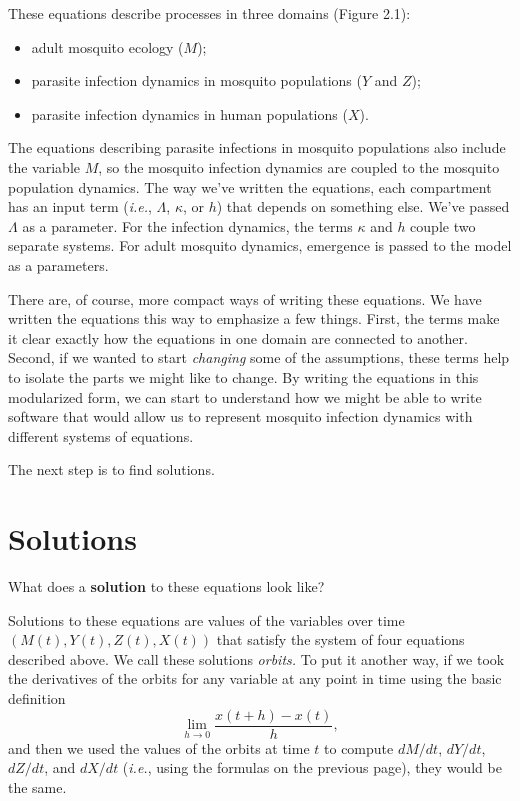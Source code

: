 \documentclass[
]{book}
\begin{document}
These equations describe processes in three domains (Figure 2.1):

\begin{itemize}
\item
  adult mosquito ecology (\(M\));
\item
  parasite infection dynamics in mosquito populations (\(Y\) and \(Z\));
\item
  parasite infection dynamics in human populations (\(X\)).
\end{itemize}

The equations describing parasite infections in mosquito populations also include the variable \(M\), so the mosquito infection dynamics are coupled to the mosquito population dynamics. The way we've written the equations, each compartment has an input term (\emph{i.e.}, \(\Lambda\), \(\kappa\), or \(h\)) that depends on something else. We've passed \(\Lambda\) as a parameter. For the infection dynamics, the terms \(\kappa\) and \(h\) couple two separate systems. For adult mosquito dynamics, emergence is passed to the model as a parameters.

There are, of course, more compact ways of writing these equations. We have written the equations this way to emphasize a few things. First, the terms make it clear exactly how the equations in one domain are connected to another. Second, if we wanted to start \emph{changing} some of the assumptions, these terms help to isolate the parts we might like to change. By writing the equations in this modularized form, we can start to understand how we might be able to write software that would allow us to represent mosquito infection dynamics with different systems of equations.

The next step is to find solutions.

\hypertarget{solutions}{%
\section{Solutions}\label{solutions}}

What does a \textbf{solution} to these equations look like?

Solutions to these equations are values of the variables over time \(\left( M(t), Y(t), Z(t), X(t) \right)\) that satisfy the system of four equations described above. We call these solutions \emph{orbits.} To put it another way, if we took the derivatives of the orbits for any variable at any point in time using the basic definition \[\lim_{h\rightarrow 0} \frac{x(t+h)-x(t)}{h},\] and then we used the values of the orbits at time \(t\) to compute \(dM/dt\), \(dY/dt\), \(dZ/dt\), and \(dX/dt\) (\emph{i.e.}, using the formulas on the previous page), they would be the same.
\end{document}
